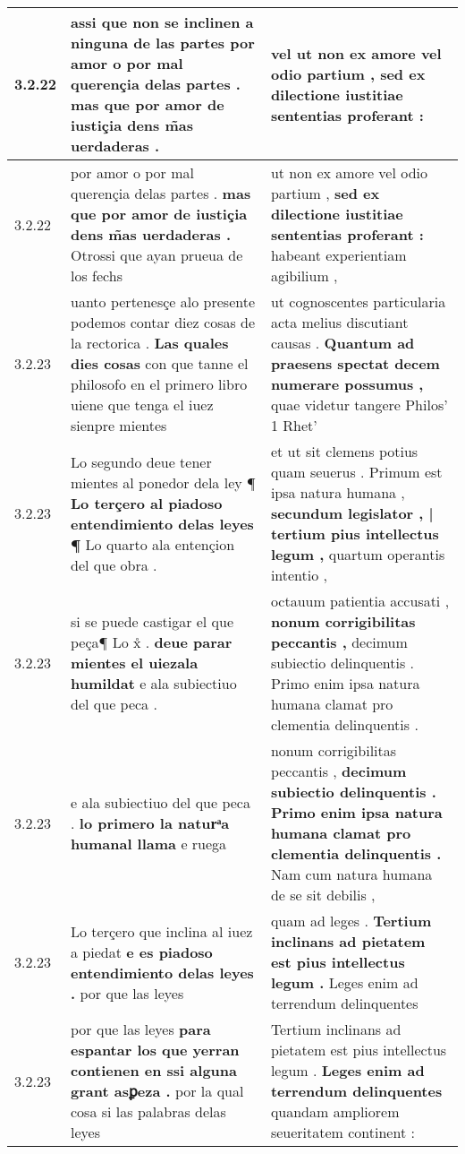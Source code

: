 \begin{tabular}{|p{1cm}|p{6.5cm}|p{6.5cm}|}
3.2.22 & assi que non se inclinen a ninguna de las partes \textbf{ por amor o por mal querençia delas partes . } mas que por amor de iustiçia dens m̃as uerdaderas . & vel \textbf{ ut non ex amore vel odio partium , } sed ex dilectione iustitiae sententias proferant : \\\hline
3.2.22 & por amor o por mal querençia delas partes . \textbf{ mas que por amor de iustiçia dens m̃as uerdaderas . } Otrossi que ayan prueua de los fechs & ut non ex amore vel odio partium , \textbf{ sed ex dilectione iustitiae sententias proferant : } habeant experientiam agibilium , \\\hline
3.2.23 & uanto pertenesçe alo presente podemos contar diez cosas de la rectorica . \textbf{ Las quales dies cosas } con que tanne el philosofo en el primero libro uiene que tenga el iuez sienpre mientes & ut cognoscentes particularia acta melius discutiant causas . \textbf{ Quantum ad praesens spectat decem numerare possumus , } quae videtur tangere Philos’ 1 Rhet’ \\\hline
3.2.23 & Lo segundo deue tener mientes al ponedor dela ley ¶ \textbf{ Lo terçero al piadoso entendimiento delas leyes ¶ } Lo quarto ala entençion del que obra . & et ut sit clemens potius quam seuerus . Primum est ipsa natura humana , \textbf{ secundum legislator , | tertium pius intellectus legum , } quartum operantis intentio , \\\hline
3.2.23 & si se puede castigar el que peça¶ Lo x̊ . \textbf{ deue parar mientes el uiezala humildat } e ala subiectiuo del que peca . & octauum patientia accusati , \textbf{ nonum corrigibilitas peccantis , } decimum subiectio delinquentis . Primo enim ipsa natura humana clamat pro clementia delinquentis . \\\hline
3.2.23 & e ala subiectiuo del que peca . \textbf{ lo primero la naturͣa humanal llama } e ruega & nonum corrigibilitas peccantis , \textbf{ decimum subiectio delinquentis . Primo enim ipsa natura humana clamat pro clementia delinquentis . } Nam cum natura humana de se sit debilis , \\\hline
3.2.23 & Lo terçero que inclina al iuez a piedat \textbf{ e es piadoso entendimiento delas leyes . } por que las leyes & quam ad leges . \textbf{ Tertium inclinans ad pietatem est pius intellectus legum . } Leges enim ad terrendum delinquentes \\\hline
3.2.23 & por que las leyes \textbf{ para espantar los que yerran contienen en ssi alguna grant asꝑeza . } por la qual cosa si las palabras delas leyes & Tertium inclinans ad pietatem est pius intellectus legum . \textbf{ Leges enim ad terrendum delinquentes } quandam ampliorem seueritatem continent : \\\hline

\end{tabular}

